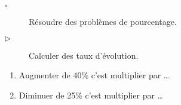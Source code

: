 \documentclass[openany]{book}
\begin{document}
\begin{atelier}[Proportionnalité]

\begin{description}
\item[$\square$] Résoudre des problèmes de pourcentage.
\item[$\triangleright$] Calculer des taux d'évolution.
\end{description}
\end{atelier}


\Exe



\Exe

\begin{enumerate}
\item Augmenter de 40\% c'est multiplier par \ldots
\item Diminuer de 25\% c'est multiplier par \ldots
\end{enumerate}


\Exe


\end{document}
